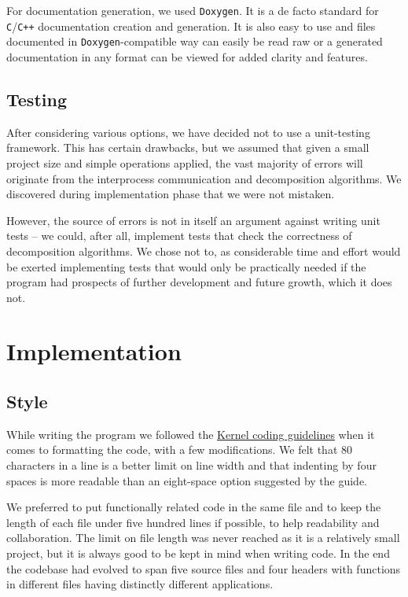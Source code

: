 \documentclass[11pt,a4paper]{article}
\begin{document}
For documentation generation, we used \texttt{Doxygen}. 
It is a de facto standard for \texttt{C}/\texttt{C++} documentation creation and generation. 
It is also easy to use and files documented in \texttt{Doxygen}-compatible way can easily be read raw or a generated documentation in any format can be viewed for added clarity and features.

\subsection{Testing}
After considering various options, we have decided not to use a unit-testing framework. 
This has certain drawbacks, but we assumed that given a small project size and simple operations applied, the vast majority of errors will originate from the interprocess communication and decomposition algorithms. 
We discovered during implementation phase that we were not mistaken. 

However, the source of errors is not in itself an argument against writing unit tests -- we could, after all, implement tests that check the correctness of decomposition algorithms.
We chose not to, as considerable time and effort would be exerted implementing tests that would only be practically needed if the program had prospects of further development and future growth, which it does not.

\section{Implementation}
\subsection{Style}
While writing the program we followed the \href{https://www.kernel.org/doc/Documentation/CodingStyle}{Kernel coding guidelines} when it comes to formatting the code, with a few modifications. 
We felt that 80 characters in a line is a better limit on line width and that indenting by four spaces is more readable than an eight-space option suggested by the guide. 

We preferred to put functionally related code in the same file and to keep the length of each file under five hundred lines if possible, to help readability and collaboration. 
The limit on file length was never reached as it is a relatively small project, but it is always good to be kept in mind when writing code.
In the end the codebase had evolved to span five source files and four headers with functions in different files having distinctly different applications.
\end{document}
